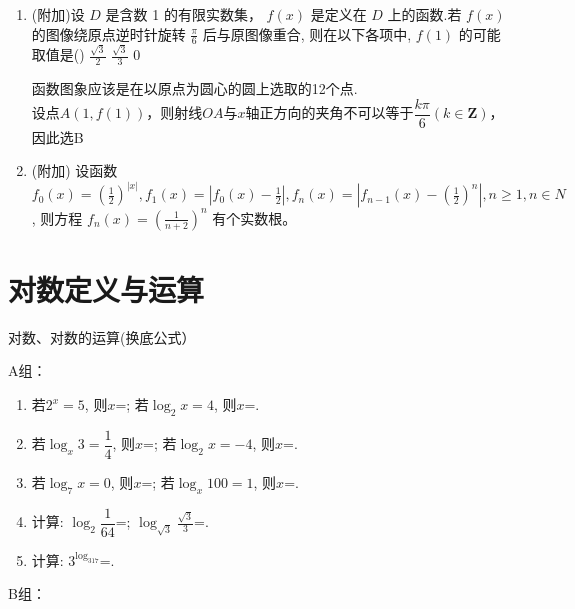\begin{enumerate}
\item (附加)设 $D$ 是含数 1 的有限实数集， $f(x)$ 是定义在 $D$ 上的函数.若 $f(x)$ 的图像绕原点逆时针旋转 $\frac{\pi}{6}$ 后与原图像重合, 则在以下各项中, $f(1)$ 的可能取值是\dotfill()
{$\frac{\sqrt{3}}{2}$}
{$\frac{\sqrt{3}}{3}$}
{0}
\begin{jieda}
    函数图象应该是在以原点为圆心的圆上选取的12个点.\\
    设点$A(1, f(1))$，则射线$OA$与$x$轴正方向的夹角不可以等于$\dfrac{k\pi}{6}(k \in \mathbf{Z})$，因此选B
\end{jieda}


\item (附加) 设函数 $f_0(x)=\left(\frac{1}{2}\right)^{|x|}, f_1(x)=\left|f_0(x)-\frac{1}{2}\right|, f_n(x)=\left|f_{n-1}(x)-\left(\frac{1}{2}\right)^n\right|, n \geq 1, n \in N$, 则方程 $f_n(x)=\left(\frac{1}{n+2}\right)^n$ 有个实数根。


\end{enumerate}

\section{对数定义与运算}

\zsd 对数、对数的运算(换底公式）

A组：

\begin{enumerate}
\item 若$2^x=5$, 则$x$=; 若$\log_2x=4$, 则$x$=. 

\item 若$\log_x3=\dfrac{1}{4}$, 则$x$=; 若$\log_2x=-4$, 则$x$=. 

\item 若$\log_7x=0$, 则$x$=; 若$\log_x100=1$, 则$x$=. 

\item 计算: $\log_2\dfrac{1}{64}$=; $\log_{\sqrt{3}}\frac{\sqrt{3}}{3}$=. 

\item 计算: $3^{\log_317}$=. 


\end{enumerate}


B组：

